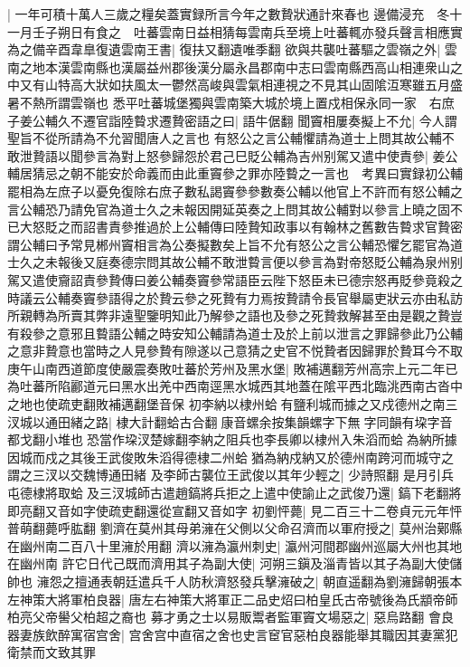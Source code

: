 |{
	一年可積十萬人三歲之糧矣蓋實録所言今年之數贄狀通計來春也}
邊備浸充　冬十一月壬子朔日有食之　吐蕃雲南日益相猜每雲南兵至境上吐蕃輒亦發兵聲言相應實為之備辛酉韋臯復遺雲南王書|{
	復扶又翻遺唯季翻}
欲與共襲吐蕃驅之雲嶺之外|{
	雲南之地本漢雲南縣也漢屬益州郡後漢分屬永昌郡南中志曰雲南縣西高山相連衆山之中又有山特高大狀如扶風太一鬱然高峻與雲氣相連視之不見其山固隂沍寒雖五月盛暑不熱所謂雲嶺也}
悉平吐蕃城堡獨與雲南築大城於境上置戍相保永同一家　右庶子姜公輔久不遷官詣陸䞇求遷贄密語之曰|{
	語牛倨翻}
聞竇相屢奏擬上不允|{
	今人謂聖旨不從所請為不允習聞唐人之言也}
有怒公之言公輔懼請為道士上問其故公輔不敢泄贄語以聞參言為對上怒參歸怨於君己巳貶公輔為吉州别駕又遣中使責參|{
	姜公輔居猜忌之朝不能安於命義而由此重竇參之罪亦陸䞇之一言也　考異曰實録初公輔罷相為左庶子以憂免復除右庶子數私謁竇參參數奏公輔以他官上不許而有怒公輔之言公輔恐乃請免官為道士久之未報因開延英奏之上問其故公輔對以參言上曉之固不已大怒貶之而詔書責參推過於上公輔傳曰陸贄知政事以有翰林之舊數告䞇求官贄密謂公輔曰予常見郴州竇相言為公奏擬數矣上旨不允有怒公之言公輔恐懼乞罷官為道士久之未報後又庭奏德宗問其故公輔不敢泄䞇言便以參言為對帝怒貶公輔為泉州别駕又遣使齎詔責參贄傳曰姜公輔奏竇參常語臣云陛下怒臣未已德宗怒再貶參竟殺之時議云公輔奏竇參語得之於贄云參之死贄有力焉按贄請令長官舉屬吏狀云亦由私訪所親轉為所賣其弊非遠聖鑒明知此乃解參之語也及參之死贄救解甚至由是觀之贄豈有殺參之意邪且䞇語公輔之時安知公輔請為道士及於上前以泄言之罪歸參此乃公輔之意非贄意也當時之人見參贄有隙遂以己意猜之史官不悦贄者因歸罪於贄耳今不取}
庚午山南西道節度使嚴震奏敗吐蕃於芳州及黑水堡|{
	敗補邁翻芳州高宗上元二年已為吐蕃所陷酈道元曰黑水出羌中西南逕黑水城西其地蓋在隂平西北臨洮西南古沓中之地也使疏吏翻敗補邁翻堡音保}
初李納以棣州蛤有鹽利城而據之又戍德州之南三汊城以通田緒之路|{
	棣大計翻蛤古合翻康音螺余按集韻螺字下無字同韻有垜字音都戈翻小堆也恐當作垜汊楚嫁翻李納之阻兵也李長卿以棣州入朱滔而蛤為納所據因城而戍之其後王武俊敗朱滔得德棣二州蛤猶為納戍納又於德州南跨河而城守之謂之三汊以交魏博通田緒}
及李師古襲位王武俊以其年少輕之|{
	少詩照翻}
是月引兵屯德棣將取蛤及三汊城師古遣趙鎬將兵拒之上遣中使諭止之武俊乃還|{
	鎬下老翻將即亮翻又音如字使疏吏翻還從宣翻又音如字}
初劉怦薨|{
	見二百三十二卷貞元元年怦普萌翻薨呼肱翻}
劉濟在莫州其母弟澭在父側以父命召濟而以軍府授之|{
	莫州治鄚縣在幽州南二百八十里澭於用翻}
濟以澭為瀛州刺史|{
	瀛州河間郡幽州巡屬大州也其地在幽州南}
許它日代己既而濟用其子為副大使|{
	河朔三鎭及淄青皆以其子為副大使儲帥也}
澭怨之擅通表朝廷遣兵千人防秋濟怒發兵擊澭破之|{
	朝直遥翻為劉澭歸朝張本}
左神策大將軍柏良器|{
	唐左右神策大將軍正二品史炤曰柏皇氏古帝號後為氏顓帝師柏亮父帝嚳父柏超之裔也}
募才勇之士以易販鬻者監軍竇文場惡之|{
	惡烏路翻}
會良器妻族飲醉寓宿宫舍|{
	宫舍宫中直宿之舍也史言䆠官惡柏良器能舉其職因其妻黨犯衛禁而文致其罪}
